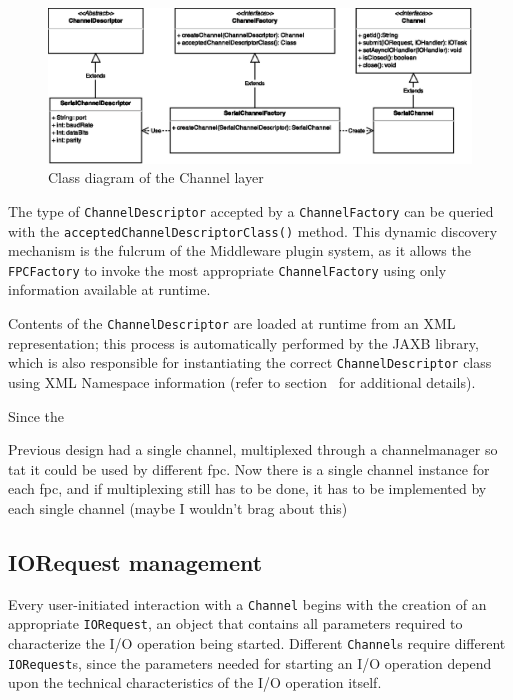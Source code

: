 \begin{figure}
\includegraphics[width=\textwidth]{imgs/channel_factory.eps}
\caption{Class diagram of the Channel layer}
\end{figure}

The type of \texttt{ChannelDescriptor} accepted by a \texttt{ChannelFactory} can be queried with the \texttt{acceptedChannelDescriptorClass()} method. This dynamic discovery mechanism is the fulcrum of the Middleware plugin system, as it allows the \texttt{FPCFactory} to invoke the most appropriate \texttt{ChannelFactory} using only information available at runtime.

Contents of the \texttt{ChannelDescriptor} are loaded at runtime from an XML representation; this process is automatically performed by the JAXB library, which is also responsible for instantiating the correct \texttt{ChannelDescriptor} class using XML Namespace information (refer to section~\label{sec:newmiddleware.descriptor} for additional details).

Since the 



Previous design had a single channel, multiplexed through a channelmanager so tat it could be used by different fpc. Now there is a single channel instance for each fpc, and if multiplexing still has to be done, it has to be implemented by each single channel (maybe I wouldn't brag about this)


\subsection{IORequest management}

Every user-initiated interaction with a \texttt{Channel} begins with the creation of an appropriate \texttt{IORequest}, an object that contains all parameters required to characterize the I/O operation being started. Different \texttt{Channel}s require different \texttt{IORequest}s, since the parameters needed for starting an I/O operation depend upon the technical characteristics of the I/O operation itself.


